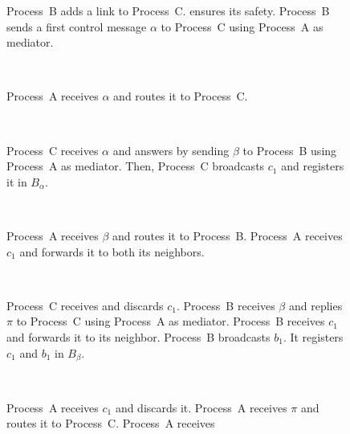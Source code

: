 \begin{figure*}
  \begin{center}
    \begin{subfigure}[t]{0.36\textwidth}
      \caption{\label{fig:solveA}Process~B adds a link to
        Process~C. \RPCBROADCAST ensures its safety. Process~B sends a first
        control message $\alpha$ to Process~C using Process~A as mediator.}
    \end{subfigure}
    ~
    \begin{subfigure}[t]{0.27\textwidth}
      \begin{center}
        \caption{\label{fig:solveB}Process~A receives $\alpha$ and routes it to
          Process~C.}
      \end{center}
    \end{subfigure}
    ~
    \begin{subfigure}[t]{0.32\textwidth}
      \caption{\label{fig:solveC}Process~C receives $\alpha$ and answers by
        sending $\beta$ to Process~B using Process~A as mediator. Then,
        Process~C broadcasts $c_1$ and registers it in $B_\alpha$.}
    \end{subfigure}      
    \\
    \begin{subfigure}[t]{0.38\textwidth}
      \caption{\label{fig:solveD}Process~A receives $\beta$ and routes it to
        Process~B.  Process~A receives $c_1$ and forwards it to both its
        neighbors.}
    \end{subfigure}
    ~
    \begin{subfigure}[t]{0.58\textwidth}
      \begin{center}
      \caption{\label{fig:solveE}Process~C receives and discards
        $c_1$.  Process~B receives $\beta$ and replies $\pi$ to
        Process~C using Process~A as mediator.  Process~B receives
        $c_1$ and forwards it to its neighbor.  Process~B broadcasts
        $b_1$. It registers $c_1$ and $b_1$ in $B_\beta$.}
      \end{center}
    \end{subfigure}
    \\
    \begin{subfigure}[t]{0.46\textwidth}
      \caption{\label{fig:solveF}Process~A receives $c_1$ and discards it.
        Process~A receives $\pi$ and routes it to Process~C. Process~A receives
}
\end{subfigure}
\end{center}
\end{figure*}
